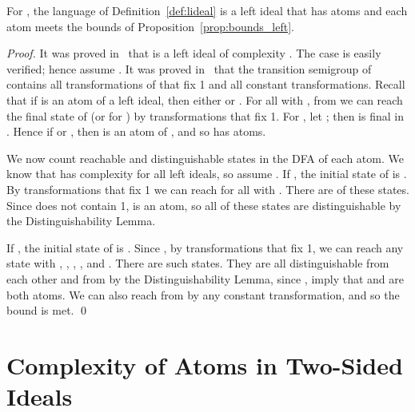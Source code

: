 \documentclass{llncs}
\newcommand{\distlemma}{the Distinguishability Lemma}
\begin{document}
\begin{theorem}
For , the language  of Definition~\ref{def:lideal} is a left ideal that has  atoms and each atom meets the bounds of  Proposition~\ref{prop:bounds_left}.
\end{theorem}
\begin{proof}
It was proved in~\cite{BrYe11} that  is a left ideal of complexity .
The case  is easily verified; hence assume .
It was proved in~\cite{BrSz14} that the transition semigroup of  contains all transformations of  that fix 1 and all constant transformations.
Recall that if  is an atom of a left ideal, then either  or . 
For all  with , from  we can reach the final state  of  (or  for ) by transformations that fix 1.
For , let ; then  is final in .
Hence if  or , then  is an atom of , and so  has  atoms.

We now count reachable and distinguishable states in the DFA of each atom. We know that  has complexity  for all left ideals, so assume .
If , the initial state of  is . By transformations that fix 1 we can reach  for all  with . There are  of these states. Since  does not contain 1,  is an atom, so all of these states are distinguishable by \distlemma.

If , the initial state of  is .
Since , by transformations that fix 1, we can reach any state  with , , , , and .
There are  such states.
They are all distinguishable from each other and from  by \distlemma, since ,  imply that  and  are both atoms.
We can also reach  from  by any constant transformation, and so  the bound is met. \qed
\end{proof}

\begin{comment}
It was also proved in~\cite{BrDa14} that right ideals of complexity  have at most  atoms, and we proved earlier that a left ideal of complexity  has at most  atoms.
In fact, there is a complexity-preserving injection from the set of atoms of  (the most complex right ideal defined in~\cite{BrDa14}) to the set of atoms of our most complex left ideal .
The set of atoms of  is ; if we let  be the transposition , then  is a subset of  that does not contain 1, and thus the map  sends  to an atom  of  with . As we just argued, this means the map preserves quotient complexity of atoms. 
The only atom of  that is not in the range of this injection is , which has complexity  and does not correspond to any atom of .
\end{comment}

\section{Complexity of Atoms in Two-Sided Ideals}
\end{document}
